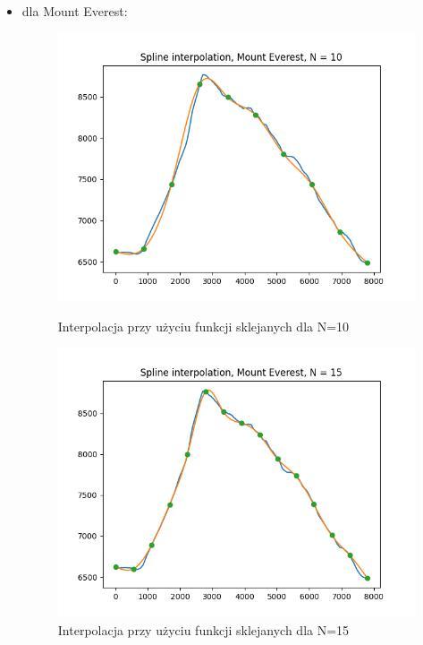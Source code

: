 \documentclass{article}
\begin{document}
\begin{itemize}
    \item dla Mount Everest:
    \begin{figure}[!htb]
      \includegraphics[width=\linewidth]{Mount_Everest_splines_N_10.png}
      \caption{Interpolacja przy użyciu funkcji sklejanych dla N=10}
    \endminipage\hfill
      \includegraphics[width=\linewidth]{Mount_Everest_splines_N_15.png}
      \caption{Interpolacja przy użyciu funkcji sklejanych dla N=15}
    \endminipage\hfill

\end{figure}
\end{itemize}
\end{document}
